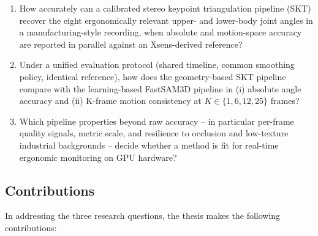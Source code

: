 \documentclass[12pt,a4paper]{article}
\begin{document}
\begin{enumerate}[label=\textbf{RQ\arabic*:}, leftmargin=1.8cm]
  \item How accurately can a calibrated stereo keypoint triangulation
        pipeline (SKT) recover the eight ergonomically relevant upper- and
        lower-body joint angles in a manufacturing-style recording, when
        absolute and motion-space accuracy are reported in parallel against
        an Xsens-derived reference?
  \item Under a unified evaluation protocol (shared timeline, common
        smoothing policy, identical reference), how does the geometry-based
        SKT pipeline compare with the learning-based FastSAM3D pipeline in
        (i) absolute angle accuracy and (ii) K-frame motion consistency at
        $K\in\{1,6,12,25\}$ frames?
  \item Which pipeline properties beyond raw accuracy -- in particular
        per-frame quality signals, metric scale, and resilience to
        occlusion and low-texture industrial backgrounds -- decide whether
        a method is fit for real-time ergonomic monitoring on GPU hardware?
\end{enumerate}

\subsection{Contributions}

In addressing the three research questions, the thesis makes the following
contributions:
\end{document}
